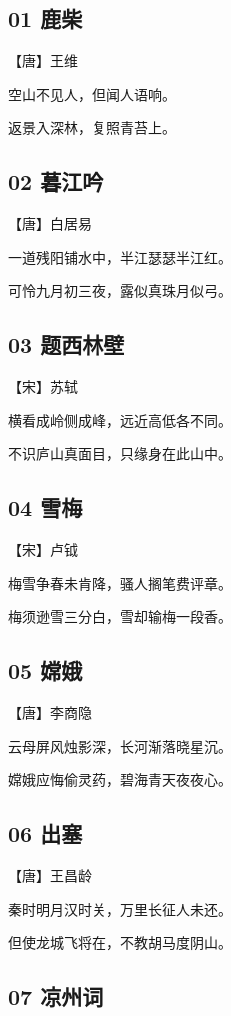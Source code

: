 \documentclass[a6paper, 12pt]{article}
\begin{document}
\subsection*{01 鹿柴}

【唐】王维

空山不见人，但闻人语响。

返景入深林，复照青苔上。

\subsection*{02 暮江吟}

【唐】白居易

一道残阳铺水中，半江瑟瑟半江红。

可怜九月初三夜，露似真珠月似弓。

\subsection*{03 题西林壁}

【宋】苏轼

横看成岭侧成峰，远近高低各不同。

不识庐山真面目，只缘身在此山中。

\subsection*{04 雪梅}

【宋】卢钺

梅雪争春未肯降，骚人搁笔费评章。

梅须逊雪三分白，雪却输梅一段香。

\subsection*{05 嫦娥}

【唐】李商隐

云母屏风烛影深，长河渐落晓星沉。

嫦娥应悔偷灵药，碧海青天夜夜心。

\subsection*{06 出塞}

【唐】王昌龄

秦时明月汉时关，万里长征人未还。

但使龙城飞将在，不教胡马度阴山。

\subsection*{07 凉州词}
\end{document}
